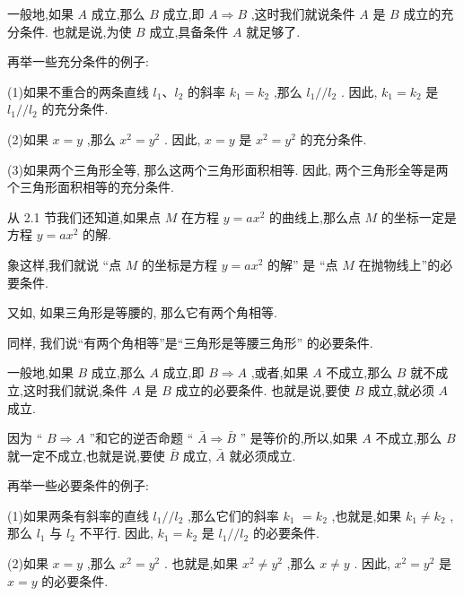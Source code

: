 \documentclass[lang=cn,newtx,12pt,scheme=chinese]{elegantbook}
\begin{document}
\begin{definition}[充分条件]
一般地,如果 \(A\) 成立,那么 \(B\) 成立,即 \(A \Rightarrow B\) ,这时我们就说条件 \(A\) 是 \(B\) 成立的充分条件. 也就是说,为使 \(B\) 成立,具备条件 \(A\) 就足够了.
\end{definition}

再举一些充分条件的例子:

(1)如果不重合的两条直线 \({l}_{1}\text{、}{l}_{2}\) 的斜率 \({k}_{1} = {k}_{2}\) ,那么 \({l}_{1}//{l}_{2}\) . 因此, \({k}_{1} = {k}_{2}\) 是 \({l}_{1}//{l}_{2}\) 的充分条件.

(2)如果 \(x = y\) ,那么 \({x}^{2} = {y}^{2}\) . 因此, \(x = y\) 是 \({x}^{2} = {y}^{2}\) 的充分条件.

(3)如果两个三角形全等, 那么这两个三角形面积相等. 因此, 两个三角形全等是两个三角形面积相等的充分条件.

从 2.1 节我们还知道,如果点 \(M\) 在方程 \(y = a{x}^{2}\) 的曲线上,那么点 \(M\) 的坐标一定是方程 \(y = a{x}^{2}\) 的解.

象这样,我们就说 “点 \(M\) 的坐标是方程 \(y = a{x}^{2}\) 的解” 是 “点 \(M\) 在抛物线上”的必要条件.

又如, 如果三角形是等腰的, 那么它有两个角相等.

同样, 我们说“有两个角相等”是“三角形是等腰三角形” 的必要条件.

\begin{definition}[必要条件]
一般地,如果 \(B\) 成立,那么 \(A\) 成立,即 \(B \Rightarrow A\) ,或者,如果 \(A\) 不成立,那么 \(B\) 就不成立,这时我们就说,条件 \(A\) 是 \(B\) 成立的必要条件. 也就是说,要使 \(B\) 成立,就必须 \(A\) 成立.
\end{definition}

\begin{corollary}[逆否命题等价性]
  因为 “ \(B \Rightarrow A\) ”和它的逆否命题 “ \(\bar{A} \Rightarrow \bar{B}\) ” 是等价的,所以,如果 \(A\) 不成立,那么 \(B\) 就一定不成立,也就是说,要使 \(\bar{B}\) 成立, \(\bar{A}\) 就必须成立.
\end{corollary}

再举一些必要条件的例子:

(1)如果两条有斜率的直线 \({l}_{1}//{l}_{2}\) ,那么它们的斜率 \({k}_{1}\) \(= {k}_{2}\) ,也就是,如果 \({k}_{1} \neq {k}_{2}\) ,那么 \({l}_{1}\) 与 \({l}_{2}\) 不平行. 因此, \({k}_{1} = {k}_{2}\) 是 \({l}_{1}//{l}_{2}\) 的必要条件.

(2)如果 \(x = y\) ,那么 \({x}^{2} = {y}^{2}\) . 也就是,如果 \({x}^{2} \neq {y}^{2}\) ,那么 \(x \neq y\) . 因此, \({x}^{2} = {y}^{2}\) 是 \(x = y\) 的必要条件.
\end{document}
